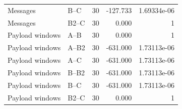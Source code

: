 \begin{table}[t]
\begin{tabular}{llrrr}
Messages & B--C & 30 & -127.733 & 1.69334e-06 \\
Messages & B2--C & 30 & 0.000 & 1 \\
Payload windows & A--B & 30 & 0.000 & 1 \\
Payload windows & A--B2 & 30 & -631.000 & 1.73113e-06 \\
Payload windows & A--C & 30 & -631.000 & 1.73113e-06 \\
Payload windows & B--B2 & 30 & -631.000 & 1.73113e-06 \\
Payload windows & B--C & 30 & -631.000 & 1.73113e-06 \\
Payload windows & B2--C & 30 & 0.000 & 1 \\
\bottomrule
\end{tabular}
\end{table}

